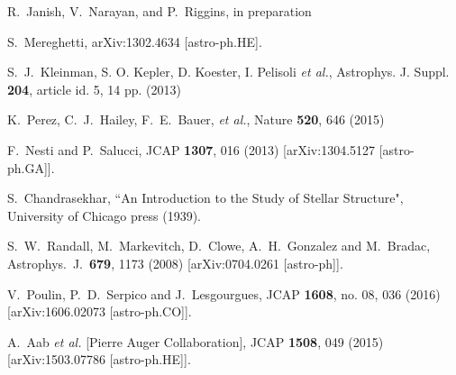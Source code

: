 R.~Janish, V.~Narayan, and P.~Riggins, in preparation

  S.~Mereghetti,
  arXiv:1302.4634 [astro-ph.HE].


S.~J.~Kleinman, S. O. Kepler, D. Koester, I. Pelisoli  {\it et al.}, Astrophys. J. Suppl. {\bf 204}, article
id. 5, 14 pp. (2013)

K.~Perez, C.~J.~Hailey, F.~E.~Bauer, {\it et al.}, Nature {\bf 520}, 646 (2015)

  F.~Nesti and P.~Salucci,
  JCAP {\bf 1307}, 016 (2013)
  [arXiv:1304.5127 [astro-ph.GA]].


S.~Chandrasekhar, ``An Introduction to the Study of Stellar Structure", University of Chicago press (1939).

  S.~W.~Randall, M.~Markevitch, D.~Clowe, A.~H.~Gonzalez and M.~Bradac,
  Astrophys.\ J.\  {\bf 679}, 1173 (2008)
  [arXiv:0704.0261 [astro-ph]].


  V.~Poulin, P.~D.~Serpico and J.~Lesgourgues,
  JCAP {\bf 1608}, no. 08, 036 (2016)
  [arXiv:1606.02073 [astro-ph.CO]].


  A.~Aab {\it et al.} [Pierre Auger Collaboration],
  JCAP {\bf 1508}, 049 (2015)
  [arXiv:1503.07786 [astro-ph.HE]].
  
